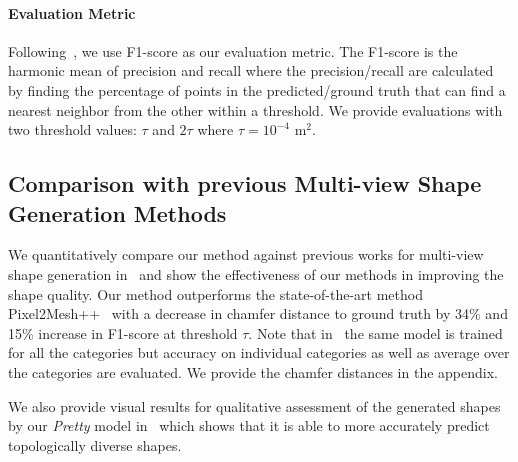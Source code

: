 
\paragraph{Evaluation Metric}\vspace{-4mm}
Following~\cite{wang2018pixel2mesh, wen2019pixel2mesh++}, we use F1-score as our evaluation metric.
The F1-score is the harmonic mean of precision and recall where the precision/recall are calculated by finding the percentage of points in the predicted/ground truth that can find a nearest neighbor from the other within a threshold.
We provide evaluations with two threshold values: $\tau$ and $2\tau$ where $\tau=10^{-4}$  m$^2$.

\subsection{Comparison with previous Multi-view Shape Generation Methods}
We quantitatively compare our method against previous works for multi-view shape generation in~ and show the effectiveness of our methods in improving the shape quality. Our method outperforms the state-of-the-art method  Pixel2Mesh++~\cite{wen2019pixel2mesh++} with
a decrease in chamfer distance to ground truth by 34\% and 15\% increase in F1-score at threshold $\tau$.
Note that in~ the same model is trained for all the categories but accuracy on individual categories as well as average over the categories are evaluated.
We provide the chamfer distances in the appendix.


We also provide visual results for qualitative assessment of the generated shapes by our \emph{Pretty} model in~ which shows that it is able to more accurately predict topologically diverse shapes.


